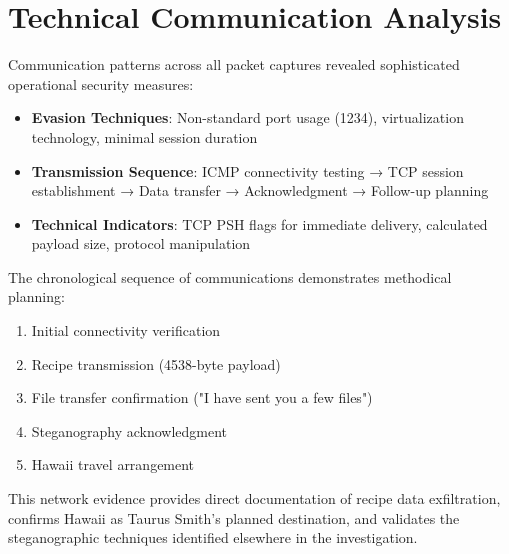 \section{Technical Communication Analysis}
Communication patterns across all packet captures revealed sophisticated operational security measures:

\begin{itemize}
    \item \textbf{Evasion Techniques}: Non-standard port usage (1234), virtualization technology, minimal session duration
    \item \textbf{Transmission Sequence}: ICMP connectivity testing → TCP session establishment → Data transfer → Acknowledgment → Follow-up planning
    \item \textbf{Technical Indicators}: TCP PSH flags for immediate delivery, calculated payload size, protocol manipulation
\end{itemize}

The chronological sequence of communications demonstrates methodical planning:
\begin{enumerate}
    \item Initial connectivity verification
    \item Recipe transmission (4538-byte payload)
    \item File transfer confirmation ("I have sent you a few files")
    \item Steganography acknowledgment 
    \item Hawaii travel arrangement
\end{enumerate}

This network evidence provides direct documentation of recipe data exfiltration, confirms Hawaii as Taurus Smith's planned destination, and validates the steganographic techniques identified elsewhere in the investigation.